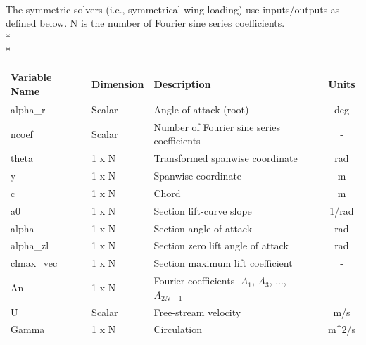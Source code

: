 \documentclass{article}
\begin{document}
\paragraph{}
The symmetric solvers (i.e., symmetrical wing loading) use
inputs/outputs as defined below.  N is the number of Fourier sine
series coefficients.\\*\\*
\begin{tabular}{|l|l|p{2.5in}|c|}
  \hline
  \textbf{Variable Name} &
  \textbf{Dimension} &
  \textbf{Description} &
  \textbf{Units}
  \\
  \hline
  alpha\_r & Scalar &
  Angle of attack (root) &
  deg
  \\
  \hline
  ncoef & Scalar &
  Number of Fourier sine series coefficients &
  -
  \\
  \hline
  theta & 1 x N &
  Transformed spanwise coordinate &
  rad
  \\
  \hline
  y & 1 x N &
  Spanwise coordinate &
  m
  \\
  \hline
  c & 1 x N &
  Chord &
  m
  \\
  \hline
  a0 & 1 x N &
  Section lift-curve slope &
  1/rad
  \\
  \hline
  alpha & 1 x N &
  Section angle of attack &
  rad
  \\
  \hline
  alpha\_zl & 1 x N &
  Section zero lift angle of attack &
  rad
  \\
  \hline
  clmax\_vec & 1 x N &
  Section maximum lift coefficient &
  -
  \\
  \hline
  An & 1 x N &
  Fourier coefficients [$A_1$, $A_3$, ..., $A_{2N-1}$] &
  -
  \\
  \hline
  U & Scalar &
  Free-stream velocity &
  m/s
  \\
  \hline
  Gamma & 1 x N &
  Circulation &
  m\^{}2/s
  \\

\end{tabular}
\end{document}
